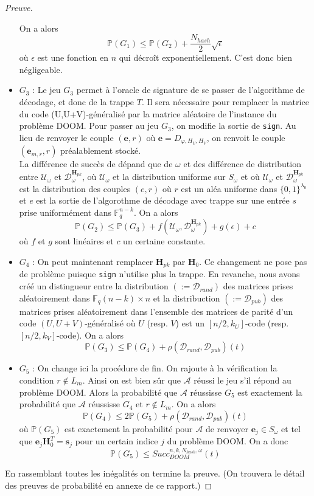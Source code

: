 \documentclass[12pt]{article}
\theoremstyle{definition}
\newcommand{\F}{\mathbb{F}}
\newcommand{\A}{\mathcal{A}}
\newcommand{\e}{\mathbf{e}}
\newcommand{\s}{\mathbf{s}}
\begin{document}
\begin{proof}[Preuve]
\begin{itemize}
On a alors 
$$ \mathbb{P}(G_1) \leq  \mathbb{P}(G_2) +  \frac{N_{hash}}{2}\sqrt{\epsilon} $$
où $\epsilon$ est une fonction en $n$ qui décroît exponentiellement. C'est donc bien négligeable.
\item $G_3$ : Le jeu $G_3$ permet à l'oracle de signature de se passer de l'algorithme de décodage, et donc de la trappe $T$. Il sera nécessaire pour remplacer la matrice du code (U,U+V)-généralisé par la matrice aléatoire de l'instance du problème DOOM. Pour passer au jeu $G_3$, on modifie la sortie de \verb|sign|. Au lieu de renvoyer le couple $(\e,r)$ où $\e = D_{\varphi,H_U,H_V}$, on renvoit le couple $(\e_{m,r},r)$ préalablement stocké.\\
 La différence de succès de dépand que de $\omega$ et des différence de distribution entre $\mathcal{U}_{\omega}$ et $\mathcal{D}_{\omega}^{\mathbf{H}_{pk}}$, où $\mathcal{U}_{\omega}$ et la distribution uniforme sur $S_{\omega}$ et où $\mathcal{U}_{\omega}$ et $\mathcal{D}_{\omega}^{\mathbf{H}_{pk}}$ est la distribution des couples $(e,r)$ où $r$ est un aléa uniforme dans $\{0,1\}^{\lambda_0}$ et $e$ est la sortie de l'algorothme de décodage avec trappe sur une entrée $s$ prise uniformément dans $\F_q^{n-k}$.
On a alors 
$$ \mathbb{P}(G_2) \leq  \mathbb{P}(G_3) + f(\mathcal{U}_{\omega},\mathcal{D}_{\omega}^{\mathbf{H}_{pk}}) + g(\epsilon) + c$$
où $f$ et $g$ sont linéaires et $c$ un certaine constante.
\item $G_4$ : On peut maintenant remplacer $\mathbf{H}_{pk}$ par $\mathbf{H}_0$. Ce changement ne pose pas de problème puisque \verb|sign| n'utilise plus la trappe. En revanche, nous avons créé un distingueur entre la distribution $(:=\mathcal{D}_{rand})$ des matrices prises aléatoirement dans $\F_q{(n-k)\times n}$ et la distribuction $(:=\mathcal{D}_{pub})$ des matrices prises aléatoirement dans l'ensemble des matrices de parité d'un code $(U,U+V)$-généralisé où $U$ (resp. $V$) est un $[n/2,k_U]$-code (resp. $[n/2,k_V]$-code). 
On a alors 
$$ \mathbb{P}(G_3) \leq  \mathbb{P}(G_4) + \rho(\mathcal{D}_{rand},\mathcal{D}_{pub})(t)$$
\item $G_5$ : On change ici la procédure de fin. On rajoute à la vérification la condition $r \notin L_m$. Ainsi on est bien sûr que $\A$ réussi le jeu s'il répond au problème DOOM. Alors la probabilité que $\A$ réussisse $G_5$ est exactement la probabilité que $\A$ réussisse $G_4$ et $r\notin L_m$.
On a alors 
$$ \mathbb{P}(G_4) \leq  2\mathbb{P}(G_5) + \rho(\mathcal{D}_{rand},\mathcal{D}_{pub})(t)$$
où $\mathbb{P}(G_5)$ est exactement la probabilité pour $\A$ de renvoyer $\e_j \in S_{\omega}$ et tel que $\e_j\mathbf{H}_0^T = \s_j$ pour un certain indice $j$ du problème DOOM. On a donc 
$$ \mathbb{P}(G_5) \leq Succ^{n,k,N_{hash}, \omega}_{DOOM}(t)$$
\end{itemize}
En rassemblant toutes les inégalités on termine la preuve. (On trouvera le détail des preuves de probabilité en annexe de ce rapport.)
\end{proof}
\end{document}
